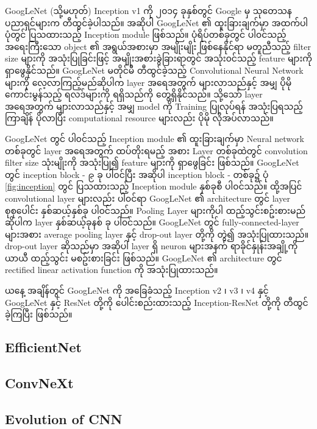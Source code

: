 GoogLeNet (သို့မဟုတ်) Inception v1 ကို ၂၀၁၄ ခုနှစ်တွင်  Google မှ သုတေသနပညာရှင်များက တီထွင်ခဲ့ပါသည်။ အဆိုပါ GoogLeNet ၏ ထူးခြားချက်မှာ အထက်ပါ ပုံတွင် ပြသထားသည့် Inception module ဖြစ်သည်။ 
ပုံရိပ်တစ်ခုတွင် ပါ၀င်သည့် အရေးကြီးသော object ၏ အရွယ်အစားမှာ အမျိုးမျိုး ဖြစ်နေနိုင်ရာ မတူညီသည့် filter size များကို အသုံးပြုခြင်းဖြင့် အမျိုးအစားခွဲခြားရာတွင် အသုံး၀င်သည့် feature များကို ရှာဖွေနိုင်သည်။ GoogLeNet မတိုင်မီ တီထွင်ခဲ့သည့်  Convolutional Neural Network များကို လေ့လာကြည့်မည်ဆိုပါက layer အရေအတွက်  များလာသည်နှင့် အမျှ ပိုမိုကောင်းမွန်သည့် ရလဒ်များကို ရရှိသည်ကို တွေ့ရှိနိုင်သည်။ သို့သော် layer အရေအတွက်  များလာသည်နှင့် အမျှ model ကို Training ပြုလုပ်ရန် အသုံးပြရသည့် ကြာချိန် ပိုလာပြီး computational resource များလည်း ပိုမို လိုအပ်လာသည်။ 

GoogLeNet တွင် ပါ၀င်သည့် Inception module ၏ ထူးခြားချက်မှာ Neural network တစ်ခုတွင်  layer အရေအတွက် ထပ်တိုးရမည့် အစား Layer တစ်ခုထဲတွင် convolution filter size သုံးမျိုးကို အသုံးပြု၍ feature များကို ရှာဖွေခြင်း ဖြစ်သည်။  GoogLeNet တွင် inception block - ၉ ခု ပါ၀င်ပြီး အဆိုပါ  inception block - တစ်ခု၌ ပုံ \ref{fig:inception} တွင် ပြသထားသည့် Inception module နှစ်ခုစီ ပါ၀င်သည်။ ထို့အပြင် convolutional layer များလည်း ပါ၀င်ရာ GoogLeNet ၏ architecture တွင် layer စုစုပေါင်း နှစ်ဆယ့်နှစ်ခု ပါ၀င်သည်။ Pooling Layer များကိုပါ ထည့်သွင်းစဥ်းစားမည်ဆိုပါက layer နှစ်ဆယ့်ခုနစ် ခု ပါ၀င်သည်။ GoogLeNet တွင် fully-connected-layer များအစား average pooling layer နှင့် drop-out layer တို့ကို တွဲ၍ အသုံးပြုထားသည်။ drop-out layer ဆိုသည်မှာ အဆိုပါ layer ရှိ neuron များအနက် ရာခိုင်နှုန်းအချို့ကို ယာယီ ထည့်သွင်း မစဥ်းစားခြင်း ဖြစ်သည်။ GoogLeNet ၏ architecture တွင် rectified linear activation function ကို အသုံးပြုထားသည်။ 

ယနေ့ အချိန်တွင် GoogLeNet ကို အခြေခံသည့် Inception v2 ၊ v3 ၊  v4 နှင့် GoogLeNet နှင့် ResNet တို့ကို ပေါင်းစည်းထားသည့် Inception-ResNet တို့ကို တီထွင်ခဲ့ကြပြီး ဖြစ်သည်။  

\subsection{EfficientNet}

\newpage
\subsection{ConvNeXt}
\newpage


\subsection{Evolution of CNN}

